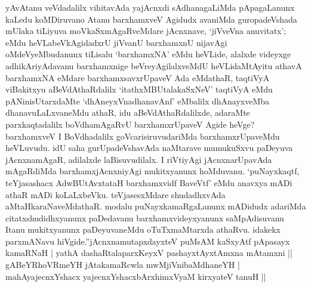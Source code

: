 \begin{artha}
yAvAtanu veVdadalilx vihitavAda yajAcnxdi sAdhanagaLiMda pApagaLanunx kaLedu koMDiruvano Atanu barxhamxveV Agidudx avaniMda guropadeVshada mUlaka tiLiyuva moVkaSxmAgaRveMdare jAcnxnave, `jiVveVna anuvitatx'; eMdu heVLabeVkAgidadxrU jiVvanU barxhamxnU nijavAgi oMdeVyeMbudanunx tiLisalu `barxhamxNA' eMdu heVLide, alalxde videyxge adhikAriyAdavanu barxhamxnige beVreyAgilalxveMdU heVLidaMtAyitu athavA barxhamxNA eMdare barxhamxsavxrUpaveV Ada eMdathaR, taqtiVyA viBakitxyu aBeVdAthaRdalilx `itathxMBUtalakaSxNeV' taqtiVyA eMdu pANinisUtarxdaMte `dhAneyxVnadhanavAnf' eMbalilx dhAnayxveMba dhanavuLaLxvaneMdu athaR, idu aBeVdAthaRdalilxde, adaraMte parxkaqtadalilx boVdhamAgaRvU barxhamxrUpaveV Agide heVge? barxhamxveV I BoVdhadalilx goVcarisiruvudariMda barxhamxrUpaveMdu heVLuvudu. idU saha gurUpadeVshavAda naMtarave mumukuSxvu paDeyuva jAcnxnamAgaR, adilalxde laBisuvudilalx. I riVtiyAgi jAcnxnarUpavAda mAgaRdiMda barxhamxjAcnxniyAgi mukitxyanunx hoMduvanu. `puNayxkaqtf, teYjasashacx AdwBUtAvxtataH barxhamxvidf BaveVtf' eMdu anavxya mADi athaR mADi koLaLxbeVku. teVjasesxMdare shudadhxvAda aMtaHkaraNaveMdathaR. modalu puNayxkamaRgaLanunx mADidudx adariMda citatxshudidhxyanunx paDedavanu barxhamxvideyxyanunx saMpAdisuvanu Itanu mukitxyanunx paDeyuvaneMdu oTuTxmaMtarxda athaRvu. idakekx parxmANavu hiVgide.''jAcnxnamutapxdayxteV puMsAM kaSxyAtf pApasayx kamaRNaH | yathA  dashaRtalaparxKeyxV pashayxtAyxtAmxna mAtamxni ||\\
gABeYRhoVRmeYH jAtakamaRcwla mwMjiVnibaMdhaneYH |\\
mahAyajecnxYshacx yajecnxYshacxbArxhimxVyaM kirxyateV tanuH ||
\end{artha}

